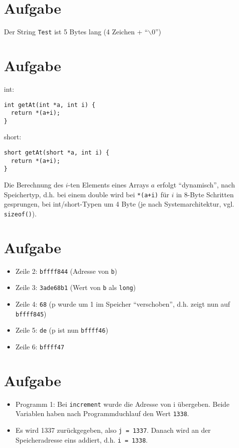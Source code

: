 \documentclass[a4paper,10pt,headlines=3.2]{scrartcl}
\begin{document}
\section{Aufgabe}
Der String \texttt{Test} ist 5 Bytes lang (4 Zeichen + ``$\backslash$0'')

\section{Aufgabe}
int:
\begin{verbatim}
int getAt(int *a, int i) {
  return *(a+i);
}
\end{verbatim}
short:
\begin{verbatim}
short getAt(short *a, int i) {
  return *(a+i);
}
\end{verbatim}
Die Berechnung des $i$-ten Elements eines Arrays $a$ erfolgt ``dynamisch'', nach Speichertyp,  d.h. bei einem double wird bei \texttt{*(a+i)} für $i$ in 8-Byte Schritten gesprungen, bei int/short-Typen um 4 Byte (je nach Systemarchitektur, vgl. \texttt{sizeof()}).

\section{Aufgabe}
\begin{itemize}
 \item Zeile 2: \texttt{bffff844} (Adresse von \texttt{b})
 \item Zeile 3: \texttt{3ade68b1} (Wert von \texttt{b} als \texttt{long})
 \item Zeile 4: \texttt{68} (p wurde um 1 im Speicher ``verschoben'', d.h. zeigt nun auf \texttt{bffff845})
 \item Zeile 5: \texttt{de} (p ist nun \texttt{bffff46})
 \item Zeile 6: \texttt{bffff47}
\end{itemize}

\section{Aufgabe}
\begin{itemize}
 \item Programm 1: Bei \texttt{increment} wurde die Adresse von i übergeben. Beide Variablen haben nach Programmduchlauf den Wert \texttt{1338}.
 \item Es wird 1337 zurückgegeben, also \texttt{j = 1337}. Danach wird an der Speicheradresse eins addiert, d.h. \texttt{i = 1338}.
\end{itemize}
\end{document}
